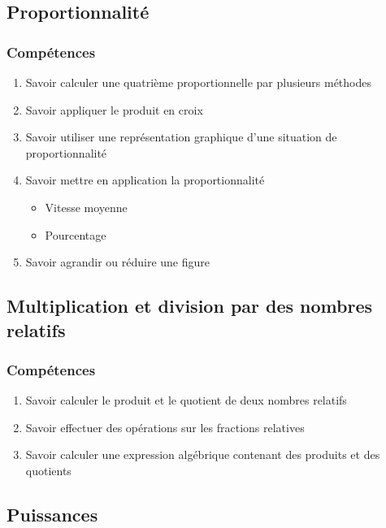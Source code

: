 \subsection{Proportionnalité}\label{ch_4_prop}

\subsubsection*{Compétences}

\begin{enumerate}
	\item Savoir calculer une quatrième proportionnelle par plusieurs méthodes
	\item Savoir appliquer le produit en croix
	\item Savoir utiliser une représentation graphique d'une situation de proportionnalité 
	\item Savoir mettre en application la proportionnalité
	\begin{itemize}
		\item Vitesse moyenne
		\item Pourcentage
	\end{itemize}
	\item Savoir agrandir ou réduire une figure

\end{enumerate}

\subsection{Multiplication et division par des nombres relatifs}\label{ch_4_mul_rel}

\subsubsection*{Compétences}

\begin{enumerate}
	\item Savoir calculer le produit et le quotient de deux nombres relatifs
	\item Savoir effectuer des opérations sur les fractions relatives
	\item Savoir calculer une expression algébrique contenant des produits et des quotients

\end{enumerate}

\subsection{Puissances}\label{ch_4_pow}

